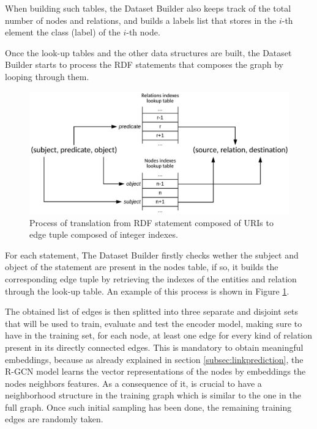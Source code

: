 \documentclass[%
    corpo=13.5pt,
    twoside,
    oldstyle,
    tipotesi=magistrale,
    greek,
    evenboxes
]{toptesi}
\begin{document}
When building such tables, the Dataset Builder also keeps track of the total
number of nodes and relations, and builds a labels list that stores in the
$i$-th element the class (label) of the $i$-th node.

Once the look-up tables and the other data structures are built, the Dataset
Builder starts to process the RDF statements that composes the graph by
looping through them.

\begin{figure}[h]
    \centering
    \includegraphics[scale=1.0]{img/rdftodata.png}
    \caption{
        Process of translation from RDF statement composed of URIs to edge
        tuple composed of integer indexes.
    }
    \label{fig:rdftodata}
\end{figure}

For each statement, The Dataset Builder firstly checks wether the subject and
object of the statement are present in the nodes table, if so, it builds the
corresponding edge tuple by retrieving the indexes of the entities and relation
through the look-up table.
An example of this process is shown in Figure \ref{fig:rdftodata}.

The obtained list of edges is then splitted into three separate and disjoint
sets that will be used to train, evaluate and test the encoder model, making
sure to have in the training set, for each node, at least one edge for
every kind of relation present in its directly connected edges.
This is mandatory to obtain meaningful embeddings, because
as already explained in section \ref{subsec:linkprediction}, the R-GCN model
learns the vector representations of the nodes by embeddings the nodes neighbors
features. As a consequence of it, is crucial to have a neighborhood structure
in the training graph which is similar to the one in the full graph.
Once such initial sampling has been done, the remaining training edges are
randomly taken.
\end{document}
